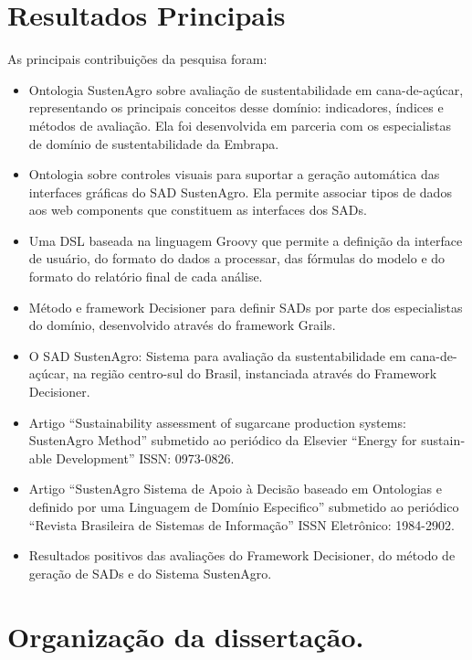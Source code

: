 \section{Resultados Principais}

As principais contribuições da pesquisa foram:
\begin{itemize}
\item Ontologia SustenAgro sobre avaliação de sustentabilidade em cana-de-açúcar,
representando os principais conceitos desse domínio: indicadores,
índices e métodos de avaliação. Ela foi desenvolvida em parceria com
os especialistas de domínio de sustentabilidade da Embrapa.
\item Ontologia sobre controles visuais para suportar a geração automática
das interfaces gráficas do SAD SustenAgro. Ela permite associar tipos
de dados aos \foreignlanguage{english}{web components} que constituem
as interfaces dos SADs.
\item Uma DSL baseada na linguagem \foreignlanguage{english}{Groovy} que
permite a definição da interface de usuário, do formato do dados a
processar, das fórmulas do modelo e do formato do relatório final
de cada análise.
\item Método e framework Decisioner para definir SADs por parte dos especialistas
do domínio, desenvolvido através do framework \foreignlanguage{english}{Grails}.
\item O SAD SustenAgro: Sistema para avaliação da sustentabilidade em cana-de-açúcar,
na região centro-sul do Brasil, instanciada através do Framework Decisioner.
\item Artigo ``\foreignlanguage{english}{Sustainability assessment of sugarcane
production systems: SustenAgro Method}'' submetido ao periódico da
\foreignlanguage{english}{Elsevier} ``\foreignlanguage{english}{Energy
for sustainable Development}'' ISSN: 0973-0826.
\item Artigo ``SustenAgro Sistema de Apoio à Decisão baseado em Ontologias
e definido por uma Linguagem de Domínio Especifico'' submetido ao
periódico ``Revista Brasileira de Sistemas de Informação'' ISSN
Eletrônico: 1984-2902.
\item Resultados positivos das avaliações do Framework Decisioner, do método
de geração de SADs e do Sistema SustenAgro.
\end{itemize}

\section{Organização da dissertação.}

